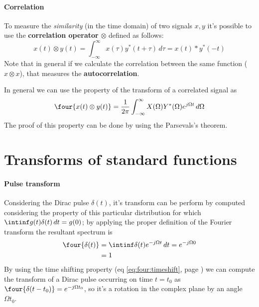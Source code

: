 		 \paragraph{Correlation} To measure the \textit{similarity} (in the time domain) of two signals $x,y$ it's possible to use the \textbf{correlation operator} $\otimes$ defined as follows:
		\begin{equation} \label{eq:four:autocorrelation}
			x(t) \otimes y(t) = \int_{-\infty}^\infty x(\tau) y^*(t+\tau)\, d\tau = x(t)*y^*(-t) 
		\end{equation}
		Note that in general if we calculate the correlation between the same function ($x\otimes x$), that measures the \textbf{autocorrelation}.
		
		In general we can use the property of the transform of a correlated signal as
		\begin{equation}
			\four{x(t)\otimes y(t)} = \frac 1{2\pi} \int_{-\infty}^\infty X(\Omega) Y^*(\Omega) e^{j\Omega t} \, d\Omega
		\end{equation}
		The proof of this property can be done by using the Parsevals's theorem.
	
	
\section{Transforms of standard functions}
	
	\paragraph{Pulse transform} Considering the Dirac pulse $\delta(t)$, it's transform can be perform by computed considering the property of this particular distribution for which $\intinf g(t)\delta(t)\, dt = g(0)$; by applying the proper definition of the Fourier transform the resultant spectrum is
	\begin{align*}
	\begin{split}
		\four{\delta(t)} & = \intinf \delta(t) e^{-j\Omega t}  \, dt = e^{-j\Omega 0} \\ & = 1
	\end{split}
	\end{align*}
	By using the  time shifting property (eq \ref{eq:four:timeshift}, page \pageref{eq:four:timeshift}) we can compute the transform of a Dirac pulse occurring on time $t = t_0$ as $\four{\delta(t-t_0)} = e^{-j\Omega t_0}$, so it's a rotation in the complex plane by an angle $\Omega t_0$.
	
